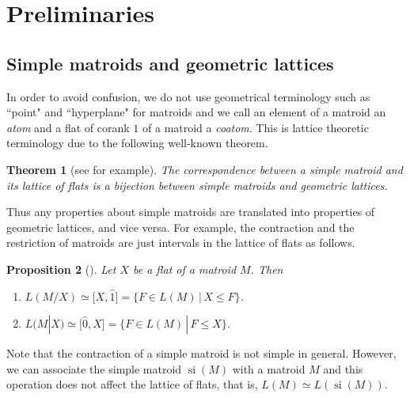 \documentclass[11pt]{article}
\newtheorem{Theorem}{Theorem}[section]
\newtheorem{Proposition}[Theorem]{Proposition}
 { \theoremstyle{definition}
\newtheorem{Definition}[Theorem]{Definition}
\newtheorem{Example}[Theorem]{Example}
\newtheorem{Remark}[Theorem]{Remark}
\newtheorem{Question}[Theorem]{Question} }
\DeclareMathOperator{\si}{si}
\begin{document}
\setcounter{section}{1}
\setcounter{subsection}{0}
\setcounter{subsubsection}{0}
\setcounter{Theorem}{10}
\setcounter{equation}{0}
\section{Preliminaries}\label{sec: preliminaries}

\subsection{Simple matroids and geometric lattices}

In order to avoid confusion, we do not use geometrical terminology such as ``point" and ``hyperplane" for matroids and we call an element of a matroid an \textit{atom} and a flat of corank $ 1 $ of a matroid a \textit{coatom}.
This is lattice theoretic terminology due to the following well-known theorem.

\begin{Theorem}[see {\cite[p.~54, Theorem 2]{welsh2010matroid}} for example]\label{simple matroid geometric lattice correspondence}
The correspondence between a simple matroid and its lattice of flats is a bijection between simple matroids and geometric lattices.
\end{Theorem}

Thus any properties about simple matroids are translated into properties of geometric lattices, and vice versa.
For example, the contraction and the restriction of matroids are just intervals in the lattice of flats as follows.

\begin{Proposition}[{\cite[Proposition 3.3.8]{oxley2011matroid}}]\label{Oxley interval}
Let $ X $ be a flat of a matroid $ M $. Then
\begin{enumerate}[$(1)$]\itemsep=0pt
\item\label{Oxley interval 1} $ L(M/X) \simeq \big[X, \hat{1}\big] = \{ F \in L(M) \,|\, X \leq F \} $.
\item\label{Oxley interval 2} $ L(M|X) \simeq \big[\hat{0}, X\big] = \{ F \in L(M) \,|\, F \leq X \} $.
\end{enumerate}
\end{Proposition}

Note that the contraction of a simple matroid is not simple in general.
However, we can associate the simple matroid $ \si(M) $ with a matroid $ M $ and this operation does not affect the lattice of flats, that is, $ L(M) \simeq L(\si(M)) $.
\end{document}
